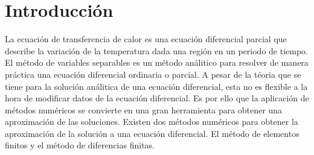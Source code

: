 \section{Introducción}

La ecuación de transferencia de calor es una ecuación diferencial parcial que describe la variación de la temperatura dada una región en un periodo de tiempo. El método de variables separables es un método análitico para resolver de manera práctica una ecuación diferencial ordinaria o parcial. A pesar de la téoria que se tiene para la solución análitica de una ecuación diferencial, esta no es flexible a la hora de modificar datos de la ecuación diferencial. Es por ello que la aplicación de métodos numéricos se convierte en una gran herramienta para obtener una aproximación de las soluciones\cite{chavarria_2019}. Existen dos métodos numéricos para obtener la aproximación de la solución a una ecuación diferencial. El método de elementos finitos y el método de diferencias finitas\cite{quintana_2016}.